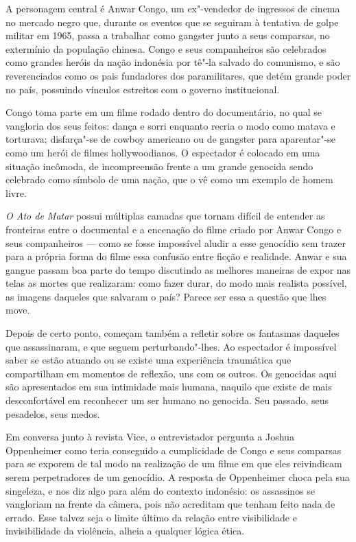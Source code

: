 A personagem central é Anwar Congo, um ex"-vendedor de ingressos de
cinema no mercado negro que, durante os eventos que se seguiram à
tentativa de golpe militar em 1965, passa a trabalhar como gangster
junto a seus comparsas, no extermínio da população chinesa. Congo e seus
companheiros são celebrados como grandes heróis da nação indonésia por
tê"-la salvado do comunismo, e são reverenciados como os pais fundadores
dos paramilitares, que detém grande poder no país, possuindo vínculos
estreitos com o governo institucional.

Congo toma parte em um filme rodado dentro do documentário, no qual se
vangloria dos seus feitos: dança e sorri enquanto recria o modo como
matava e torturava; disfarça"-se de cowboy americano ou de gangster para
aparentar"-se como um herói de filmes hollywoodianos. O espectador é
colocado em uma situação incômoda, de incompreensão frente a um grande
genocida sendo celebrado como símbolo de uma nação, que o vê como um
exemplo de homem livre.

\emph{O Ato de Matar} possui múltiplas camadas que tornam difícil de
entender as fronteiras entre o documental e a encenação do filme criado
por Anwar Congo e seus companheiros --- como se fosse impossível aludir a
esse genocídio sem trazer para a própria forma do filme essa confusão
entre ficção e realidade. Anwar e sua gangue passam boa parte do tempo
discutindo as melhores maneiras de expor nas telas as mortes que
realizaram: como fazer durar, do modo mais realista possível, as imagens
daqueles que salvaram o país? Parece ser essa a questão que lhes move.

Depois de certo ponto, começam também a refletir sobre os fantasmas
daqueles que assassinaram, e que seguem perturbando"-lhes. Ao espectador
é impossível saber se estão atuando ou se existe uma experiência
traumática que compartilham em momentos de reflexão, uns com os outros.
Os genocidas aqui são apresentados em sua intimidade mais humana,
naquilo que existe de mais desconfortável em reconhecer um ser humano no
genocida. Seu passado, seus pesadelos, seus medos.

\asterisc

Em conversa junto à revista Vice, o entrevistador pergunta a Joshua
Oppenheimer como teria conseguido a cumplicidade de Congo e seus
comparsas para se exporem de tal modo na realização de um filme em que
eles reivindicam serem perpetradores de um genocídio. A resposta de
Oppenheimer choca pela sua singeleza, e nos diz algo para além do
contexto indonésio: os assassinos se vangloriam na frente da câmera,
pois não acreditam que tenham feito nada de errado. Esse talvez seja o
limite último da relação entre visibilidade e invisibilidade da
violência, alheia a qualquer lógica ética.

